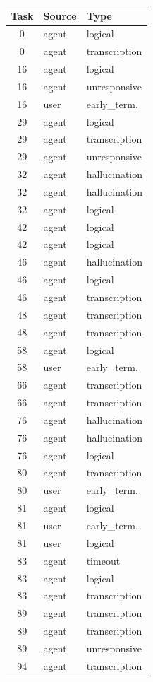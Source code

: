 \begin{tabular}{cll}
\toprule
\textbf{Task} & \textbf{Source} & \textbf{Type} \\
\midrule
0 & agent & logical \\
0 & agent & transcription \\
16 & agent & logical \\
16 & agent & unresponsive \\
16 & user & early\_term. \\
29 & agent & logical \\
29 & agent & transcription \\
29 & agent & unresponsive \\
32 & agent & hallucination \\
32 & agent & hallucination \\
32 & agent & logical \\
42 & agent & logical \\
42 & agent & logical \\
46 & agent & hallucination \\
46 & agent & logical \\
46 & agent & transcription \\
48 & agent & transcription \\
48 & agent & transcription \\
58 & agent & logical \\
58 & user & early\_term. \\
66 & agent & transcription \\
66 & agent & transcription \\
76 & agent & hallucination \\
76 & agent & hallucination \\
76 & agent & logical \\
80 & agent & transcription \\
80 & user & early\_term. \\
81 & agent & logical \\
81 & user & early\_term. \\
81 & user & logical \\
83 & agent & timeout \\
83 & agent & logical \\
83 & agent & transcription \\
89 & agent & transcription \\
89 & agent & transcription \\
89 & agent & unresponsive \\
94 & agent & transcription \\

\end{tabular}
